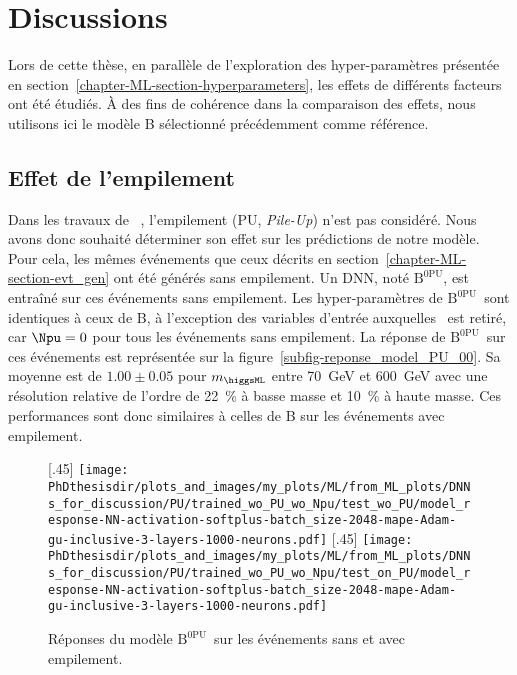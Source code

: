 \section{Discussions}\label{chapter-ML-section-discussion}
Lors de cette thèse,
en parallèle de l'exploration des hyper-paramètres présentée en section~\ref{chapter-ML-section-hyperparameters},
les effets de différents facteurs ont été étudiés.
À des fins de cohérence dans la comparaison des effets,
nous utilisons ici le modèle B sélectionné précédemment comme référence.
\subsection{Effet de l'empilement}
\def\Bnpu{$\text{B}^\text{0PU}$}
Dans les travaux de \citeauthor{BARTSCHI201929}~\cite{BARTSCHI201929},
l'empilement (PU, \emph{Pile-Up}) n'est pas considéré.
Nous avons donc souhaité déterminer son effet sur les prédictions de notre modèle.
Pour cela, les mêmes événements que ceux décrits en section~\ref{chapter-ML-section-evt_gen} ont été générés sans empilement.
Un DNN, noté \Bnpu, est entraîné sur ces événements sans empilement.
Les hyper-paramètres de \Bnpu\ sont identiques à ceux de B, à l'exception des variables d'entrée auxquelles \Npu\ est retiré, car $\Npu=0$ pour tous les événements sans empilement.
La réponse de \Bnpu\ sur ces événements est représentée sur la figure~\ref{subfig-reponse_model_PU_00}.
Sa moyenne est de $\num{1.00}\pm\num{0.05}$ pour $m_{\higgsML}$ entre \SI{70}{\GeV} et \SI{600}{\GeV} avec une résolution relative de l'ordre de \SI{22}{\%} à basse masse et \SI{10}{\%} à haute masse.
Ces performances sont donc similaires à celles de B sur les événements avec empilement.
\begin{figure}[h]
\centering

[.45\textwidth]
{\texttt{[image: \\PhDthesisdir/plots\_and\_images/my\_plots/ML/from\_ML\_plots/DNNs\_for\_discussion/PU/trained\_wo\_PU\_wo\_Npu/test\_wo\_PU/model\_response-NN-activation-softplus-batch\_size-2048-mape-Adam-gu-inclusive-3-layers-1000-neurons.pdf]}\vspace{-.5\baselineskip}}
\hfill
{}[.45\textwidth]
{\texttt{[image: \\PhDthesisdir/plots\_and\_images/my\_plots/ML/from\_ML\_plots/DNNs\_for\_discussion/PU/trained\_wo\_PU\_wo\_Npu/test\_on\_PU/model\_response-NN-activation-softplus-batch\_size-2048-mape-Adam-gu-inclusive-3-layers-1000-neurons.pdf]}\vspace{-.5\baselineskip}}

\caption{Réponses du modèle \Bnpu\ sur les événements sans et avec empilement.}
\label{fig-reponse_model_0PU}
\end{figure}
